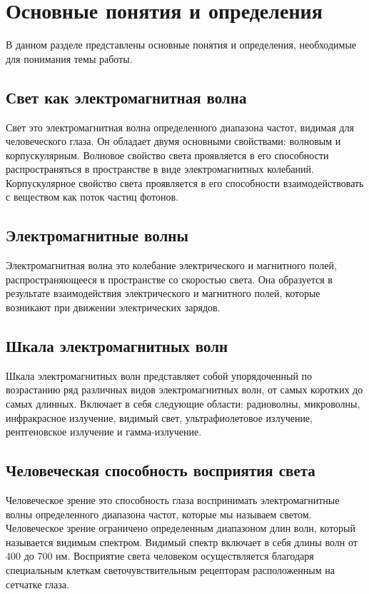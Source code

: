 \documentclass{article}
\begin{document}
\newpage
\section{Основные понятия и определения}
В данном разделе представлены основные понятия и определения, необходимые для понимания темы работы.
\subsection{Свет как электромагнитная волна}
Свет  это электромагнитная волна определенного диапазона частот, видимая для человеческого глаза. Он обладает двумя основными свойствами: волновым и корпускулярным. Волновое свойство света проявляется в его способности распространяться в пространстве в виде электромагнитных колебаний. Корпускулярное свойство света проявляется в его способности взаимодействовать с веществом как поток частиц  фотонов.
\subsection{Электромагнитные волны}
Электромагнитная волна  это колебание электрического и магнитного полей, распространяющееся в пространстве со скоростью света. Она образуется в результате взаимодействия электрического и магнитного полей, которые возникают при движении электрических зарядов.
\subsection{Шкала электромагнитных волн}
Шкала электромагнитных волн представляет собой упорядоченный по возрастанию ряд различных видов электромагнитных волн, от самых коротких до самых длинных. Включает в себя следующие области: радиоволны, микроволны, инфракрасное излучение, видимый свет, ультрафиолетовое излучение, рентгеновское излучение и гамма-излучение.
\subsection{Человеческая способность восприятия света}
Человеческое зрение  это способность глаза воспринимать электромагнитные волны определенного диапазона частот, которые мы называем светом. Человеческое зрение ограничено определенным диапазоном длин волн, который называется видимым спектром. Видимый спектр включает в себя длины волн от 400 до 700 нм. Восприятие света человеком осуществляется благодаря специальным клеткам  светочувствительным рецепторам  расположенным на сетчатке глаза.
\end{document}
